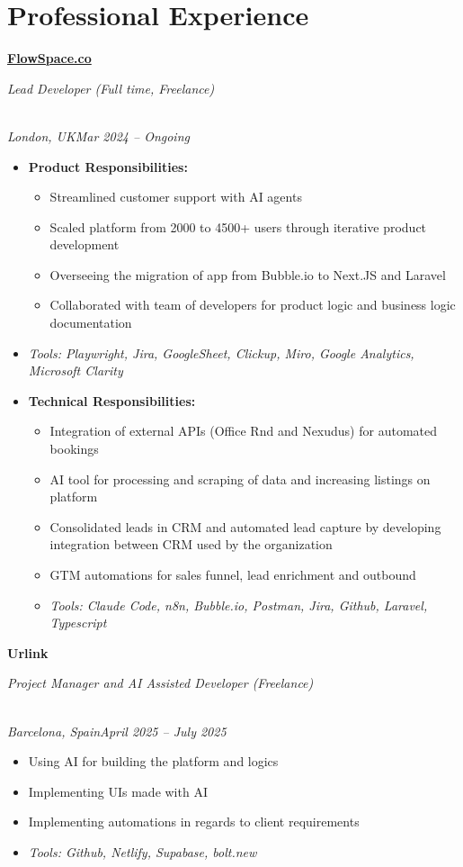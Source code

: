 \documentclass[a4paper,10pt]{article}
\newcommand{\role}[4]{\vspace{3pt}\noindent\hspace{0.6em}\parbox[t]{0.38\textwidth}{\raggedright\textbf{#1}}\hfill\parbox[t]{0.58\textwidth}{\raggedleft\textit{#2}}\\{\textit{#3}\hfill\textit{#4}}\vspace{1pt}}
\begin{document}
\section{Professional Experience}
\role{\href{https://flowspace.co}{FlowSpace.co}}{Lead Developer (Full time, Freelance)}{London, UK}{Mar 2024 -- Ongoing}
\begin{itemize}
\item \textbf{Product Responsibilities:}
\begin{itemize}[label=--]
\item Streamlined customer support with AI agents
\item Scaled platform from 2000 to 4500+ users through iterative product development
\item Overseeing the migration of app from Bubble.io to Next.JS and Laravel
\item Collaborated with team of developers for product logic and business logic documentation
\end{itemize}
\item \textit{Tools: Playwright, Jira, GoogleSheet, Clickup, Miro, Google Analytics, Microsoft Clarity}
\item \textbf{Technical Responsibilities:}
\begin{itemize}[label=--]
\item Integration of external APIs (Office Rnd and Nexudus) for automated bookings
\item AI tool for processing and scraping of data and increasing listings on platform
\item Consolidated leads in CRM and automated lead capture by developing integration between CRM used by the organization
\item GTM automations for sales funnel, lead enrichment and outbound
\item \textit{Tools: Claude Code, n8n, Bubble.io, Postman, Jira, Github, Laravel, Typescript}
\end{itemize}
\end{itemize}

\role{Urlink}{Project Manager and AI Assisted Developer (Freelance)}{Barcelona, Spain}{April 2025 -- July 2025}
\begin{itemize}
\item Using AI for building the platform and logics
\item Implementing UIs made with AI
\item Implementing automations in regards to client requirements
\item \textit{Tools: Github, Netlify, Supabase, bolt.new}
\end{itemize}
\end{document}
